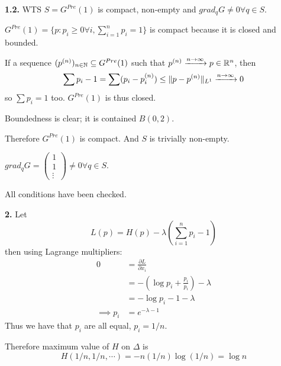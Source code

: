 \documentclass[a4paper, 12pt]{article}
\begin{document}
\begin{solution}
    \textbf{1.2.} WTS $S = G^{Pre}(1)$ is compact, non-empty and $grad_{q}G \neq  0\forall q \in S$.

    $G^{Pre}(1) = \{p : p_i \geq 0 \forall i, \sum_{i=1}^n p_i = 1 \}$ is compact because it is closed and bounded.

    If a sequence $(p^{(n)})_{n \in \mathbb{N}} \subseteq G^{Pre}(1)$ such that $p^{(n)} \xrightarrow{n \to \infty} p \in \mathbb{R}^n$, then \[
        \sum p_i - 1 = \sum (p_i - p^{(n)}_i) \leq \lVert p - p^{(n)}\rVert_{L^1} \xrightarrow{n \to \infty} 0
    \]
    so $\sum p_i = 1$ too. $G^{Pre}(1)$ is thus closed.

    Boundedness is clear; it is contained $B(0, 2)$.

    Therefore $G^{Pre}(1)$ is compact. And $S$ is trivially non-empty.

    $grad_{q}G = \begin{pmatrix}
            1 \\
            1 \\
            \vdots
        \end{pmatrix} \neq 0 \forall q \in S$.

    All conditions have been checked.

    \textbf{2.} Let \[
        L(p) = H(p) - \lambda \left(\sum_{i=1}^{n} p_i - 1\right)
    \]
    then using Lagrange multipliers:
    \begin{align*}
        0            & = \frac{\partial L}{\partial x_i}          \\
                     & = - (\log p_i + \frac{p_i}{p_i}) - \lambda \\
                     & = - \log p_i - 1 - \lambda                 \\
        \implies p_i & = e^{-\lambda -1}
    \end{align*}
    Thus we have that $p_i$ are all equal, $p_i = 1/n$.

    Therefore maximum value of $H$ on $\Delta$ is \[
        H(1/n, 1/n, \cdots) = -n (1/n) \log(1/n) = \log n
    \]




\end{solution}
\end{document}
